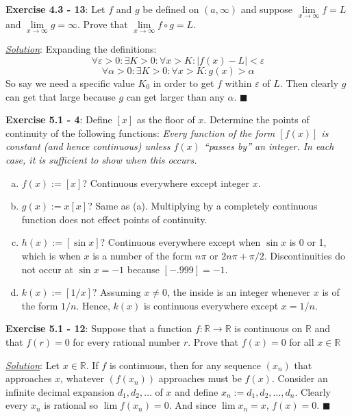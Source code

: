 \documentclass{article}
\begin{document}
\hrulefill

\textbf{Exercise 4.3 - 13}: Let $f$ and $g$ be defined on $(a, \infty)$
and suppose $\lim\limits_{x\to\infty}f=L$ and
$\lim\limits_{x\to\infty}g=\infty$. Prove that
$\lim\limits_{x\to\infty}f\circ g = L$.

\underline{\textit{Solution}}: Expanding the definitions:
\[\forall\varepsilon>0:\exists K>0:\forall x>K: |f(x)-L|<\varepsilon\]
\[\forall\alpha>0:\exists K>0:\forall x>K: g(x)>\alpha\]
So say we need a specific value $K_0$ in order to get $f$ within
$\varepsilon$ of $L$. Then clearly $g$ can get that large because
$g$ can get larger than any $\alpha$. \hfill $\blacksquare$

\hrulefill

\textbf{Exercise 5.1 - 4}: Define $[x]$ as the floor of $x$. Determine the
points of continuity of the following functions:
\textit{Every function of the form $[f(x)]$ is constant (and hence
continuous) unless $f(x)$ ``passes by'' an integer. In each case, it is
sufficient to show when this occurs.}

\begin{enumerate}[(a)]
  \item $f(x):=[x]$? Continuous everywhere except integer $x$.
  \item $g(x):=x[x]$? Same as (a). Multiplying by a completely continuous
    function does not effect points of continuity.
  \item $h(x):=[\sin x]$? Continuous everywhere except when $\sin x$ is 0 or
    1, which is when $x$ is a number of the form $n\pi$ or $2n\pi+\pi/2$.
    Discontinuities do not occur at $\sin x = -1$ because $[-.999]=-1$.
  \item $k(x):=[1/x]$? Assuming $x \not= 0$, the inside is an integer
    whenever $x$ is of the form $1/n$. Hence, $k(x)$ is continuous
    everywhere except $x=1/n$.
\end{enumerate}

\hrulefill

\textbf{Exercise 5.1 - 12}: Suppose that a function
$f:\mathbb R\to\mathbb R$ is continuous on $\mathbb R$ and that
$f(r)=0$ for every rational number $r$. Prove that $f(x)=0$ for all
$x\in\mathbb R$

\underline{\textit{Solution}}: Let $x\in\mathbb{R}$.  If $f$ is continuous,
then for any sequence $(x_n)$ that approaches $x$, whatever $(f(x_n))$
approaches must be $f(x)$.  Consider an infinite decimal expansion
$d_1,d_2,\dots$ of $x$ and define $x_n:=d_1,d_2,\dots,d_n$. Clearly every
$x_n$ is rational so $\lim f(x_n) = 0$. And since $\lim x_n = x$, $f(x)=0$.
\hfill $\blacksquare$
\end{document}
